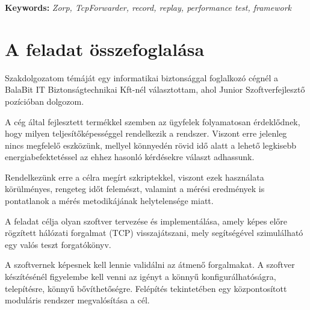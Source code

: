 \documentclass[a4paper,12pt,oneside]{report}
\begin{document}
\vspace{2cm}
 
{\bf Keywords:} {\it Zorp, TcpForwarder, record, replay, performance test, framework}
\newpage

\renewcommand{\thefigure}{\arabic{figure}}


\setcounter{tocdepth}{3} %
\thispagestyle{empty}
\tableofcontents
\pagebreak

\setcounter{page}{1} %
\pagestyle{plain}
\fancyhead[C]{\rightmark}
\fancyfoot[R]{\thepage}

\section{A feladat összefoglalása}

Szakdolgozatom témáját egy informatikai biztonsággal foglalkozó cégnél a BalaBit IT Biztonságtechnikai Kft-nél választottam, ahol Junior Szoftverfejlesztő pozícióban dolgozom.

A cég által fejlesztett termékkel szemben az ügyfelek folyamatosan érdeklődnek, hogy milyen teljesítőképességgel rendelkezik a rendszer.
Viszont erre jelenleg nincs megfelelő eszközünk, mellyel könnyedén rövid idő alatt a lehető legkisebb energiabefektetéssel az ehhez hasonló kérdésekre választ adhassunk.

Rendelkezünk erre a célra megírt szkriptekkel, viszont ezek használata körülményes, rengeteg időt felemészt, valamint a mérési eredmények is pontatlanok a mérés metodikájának helytelensége miatt.


A feladat célja olyan szoftver tervezése és implementálása, amely képes előre
rögzített hálózati forgalmat (TCP) visszajátszani, mely segítségével szimulálható egy
valós teszt forgatókönyv.

A szoftvernek képesnek kell lennie validálni az átmenő forgalmakat.
A szoftver készítésénél figyelembe kell venni az igényt a könnyű
konfigurálhatóságra, telepítésre, könnyű bővíthetőségre. Felépítés tekintetében egy
központosított moduláris rendszer megvalósítása a cél.
\end{document}
